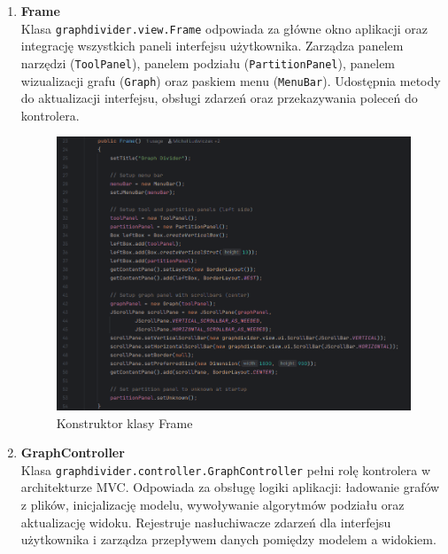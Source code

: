 \documentclass{article}
\begin{document}
    \begin{enumerate}
        \item \textbf{Frame} \\
        Klasa \texttt{graphdivider.view.Frame} odpowiada za główne okno aplikacji oraz integrację wszystkich paneli interfejsu użytkownika. Zarządza panelem narzędzi (\texttt{ToolPanel}), panelem podziału (\texttt{PartitionPanel}), panelem wizualizacji grafu (\texttt{Graph}) oraz paskiem menu (\texttt{MenuBar}). Udostępnia metody do aktualizacji interfejsu, obsługi zdarzeń oraz przekazywania poleceń do kontrolera.

        \begin{figure}[H]
            \centering
            \includegraphics[width=1\linewidth]{img/frame.png}
            \caption{Konstruktor klasy Frame}
            \label{fig:frame}
        \end{figure}
    
        \item \textbf{GraphController} \\
        Klasa \texttt{graphdivider.controller.GraphController} pełni rolę kontrolera w architekturze MVC. Odpowiada za obsługę logiki aplikacji: ładowanie grafów z plików, inicjalizację modelu, wywoływanie algorytmów podziału oraz aktualizację widoku. Rejestruje nasłuchiwacze zdarzeń dla interfejsu użytkownika i zarządza przepływem danych pomiędzy modelem a widokiem.


\end{enumerate}
\end{document}
